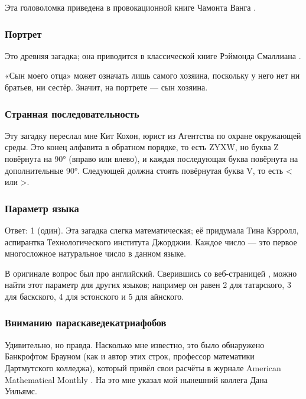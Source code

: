 Эта головоломка приведена в провокационной книге Чамонта Ванга \cite{58}.

\subsubsection*{Портрет}

Это древняя загадка;
она приводится в классической книге Рэймонда Смаллиана \cite{55}.

«Сын моего отца» может означать лишь самого хозяина, поскольку у него нет ни братьев, ни сестёр.
Значит, на портрете — сын хозяина.

\subsubsection*{Странная последовательность}

Эту загадку переслал мне Кит Кохон, юрист из Агентства по охране окружающей среды.
Это конец алфавита в обратном порядке, то есть ZYXW, но буква Z повёрнута на 90° (вправо или влево), и каждая последующая буква повёрнута на дополнительные 90°.
Следующей должна стоять повёрнутая буква V, то есть < или >.

\subsubsection*{Параметр языка}

Ответ: 1 (один).
Эта загадка слегка математическая;
её придумала Тина Кэрролл, аспирантка Технологического института Джорджии. 
Каждое число — это первое многосложное натуральное число в данном языке.

\begin{addedbytheeditors}
В оригинале вопрос был про английский.
Сверившись со веб-страницей \cite{numerals}, можно найти этот параметр для других языков;
например он равен 2 для татарского, 3 для баскского, 4 для эстонского и 5 для айнского. \pr
\end{addedbytheeditors}


\subsubsection*{Вниманию параскаведекатриафобов}

Удивительно, но правда.
Насколько мне известно, это было обнаружено Банкрофтом Брауном (как и автор этих строк, профессор математики Дартмутского колледжа), который привёл свои расчёты в журнале American Mathematical Monthly \cite{11}.
На это мне указал мой нынешний коллега Дана Уильямс.

